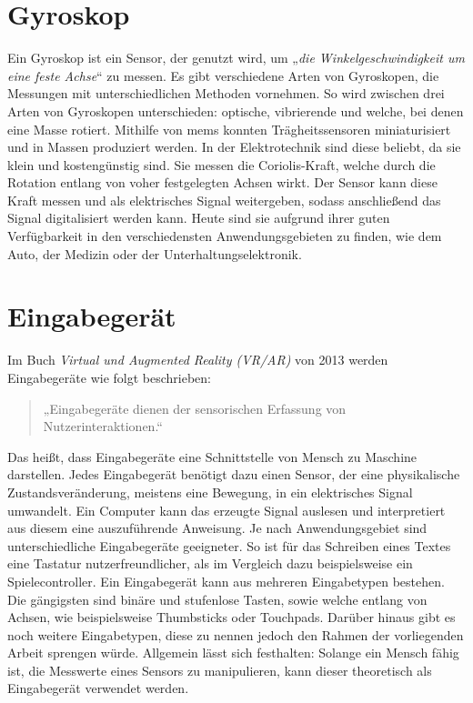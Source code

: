 \section{Gyroskop}
Ein Gyroskop ist ein Sensor, der genutzt wird, um „\textit{die Winkelgeschwindigkeit um eine feste Achse}“ zu messen\cite{armeniseAdvancesGyroscopeTechnologies2010}.
Es gibt verschiedene Arten von Gyroskopen, die Messungen mit unterschiedlichen Methoden vornehmen.
So wird zwischen drei Arten von Gyroskopen unterschieden: optische, vibrierende und welche, bei denen eine Masse rotiert.
Mithilfe von \ac{mems} konnten Trägheitssensoren miniaturisiert und in Massen produziert werden.
In der Elektrotechnik sind diese beliebt, da sie klein und kostengünstig sind\cite{maenakaMEMSInertialSensors2008}.
Sie messen die Coriolis-Kraft, welche durch die Rotation entlang von voher festgelegten Achsen wirkt.
Der Sensor kann diese Kraft messen und als elektrisches Signal weitergeben, sodass anschließend das Signal digitalisiert werden kann\cite{utmelMPU6050ModuleDatasheet}.
Heute sind sie aufgrund ihrer guten Verfügbarkeit in den verschiedensten Anwendungsgebieten zu finden, wie dem Auto, der Medizin oder der Unterhaltungselektronik\cite{armeniseAdvancesGyroscopeTechnologies2010}.

\section{Eingabegerät}
Im Buch \textit{Virtual und Augmented Reality (VR/AR)} von 2013 werden Eingabegeräte wie folgt beschrieben:

\begin{quote}
    „Eingabegeräte dienen der sensorischen Erfassung von Nutzerinteraktionen.“\cite{doernerVirtualUndAugmented2013}
\end{quote}

Das heißt, dass Eingabegeräte eine Schnittstelle von Mensch zu Maschine darstellen.
Jedes Eingabegerät benötigt dazu einen Sensor, der eine physikalische Zustandsveränderung, meistens eine Bewegung, in ein elektrisches Signal umwandelt.
Ein Computer kann das erzeugte Signal auslesen und interpretiert aus diesem eine auszuführende Anweisung.
Je nach Anwendungsgebiet sind unterschiedliche Eingabegeräte geeigneter.
So ist für das Schreiben eines Textes eine Tastatur nutzerfreundlicher, als im Vergleich dazu beispielsweise ein Spielecontroller.
Ein Eingabegerät kann aus mehreren Eingabetypen bestehen.
Die gängigsten sind binäre und stufenlose Tasten, sowie welche entlang von Achsen, wie beispielsweise Thumbsticks oder Touchpads.
Darüber hinaus gibt es noch weitere Eingabetypen, diese zu nennen jedoch den Rahmen der vorliegenden Arbeit sprengen würde.
Allgemein lässt sich festhalten:
Solange ein Mensch fähig ist, die Messwerte eines Sensors zu manipulieren, kann dieser theoretisch als Eingabegerät verwendet werden.
